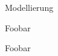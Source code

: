 \begin{antwort}[5]{Modellierung}
\begin{subantworten}
\item Foobar
\item Foobar
\end{subantworten}
\end{antwort}

